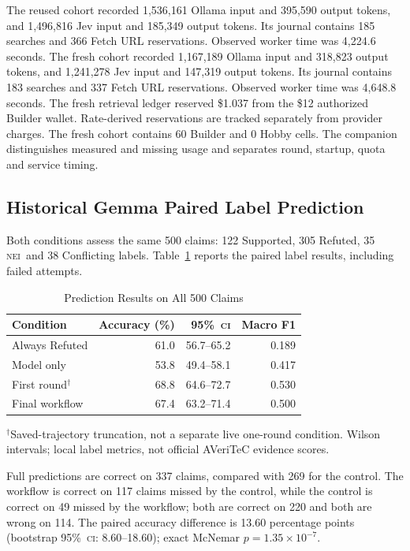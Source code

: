 \documentclass[conference]{IEEEtran}
\newcommand{\NEI}{\textsc{nei}}
\newcommand{\CI}{\textsc{ci}}
\newcommand{\pct}{\%}
\begin{document}
The reused cohort recorded 1,536,161 Ollama input and 395,590 output tokens, and 1,496,816 Jev input and 185,349 output tokens. Its journal contains 185 searches and 366 Fetch URL reservations. Observed worker time was 4,224.6 seconds. The fresh cohort recorded 1,167,189 Ollama input and 318,823 output tokens, and 1,241,278 Jev input and 147,319 output tokens. Its journal contains 183 searches and 337 Fetch URL reservations. Observed worker time was 4,648.8 seconds. The fresh retrieval ledger reserved \$1.037 from the \$12 authorized Builder wallet. Rate-derived reservations are tracked separately from provider charges. The fresh cohort contains 60 Builder and 0 Hobby cells. The companion distinguishes measured and missing usage and separates round, startup, quota and service timing.

\subsection{Historical Gemma Paired Label Prediction}
Both conditions assess the same 500 claims: 122 Supported, 305 Refuted, 35 \NEI\ and 38 Conflicting labels. Table~\ref{tab:prediction} reports the paired label results, including failed attempts.

\begin{table}[t]
\caption{Prediction Results on All 500 Claims}
\label{tab:prediction}
\centering
\footnotesize
\begin{tabular}{@{}lrrr@{}}
\toprule
Condition & Accuracy (\pct) & 95\pct\ \CI & Macro F1\\
\midrule
Always Refuted & 61.0 & 56.7--65.2 & 0.189\\
Model only & 53.8 & 49.4--58.1 & 0.417\\
First round$^{\dagger}$ & 68.8 & 64.6--72.7 & 0.530\\
Final workflow & 67.4 & 63.2--71.4 & 0.500\\
\bottomrule
\end{tabular}
\par\smallskip
\parbox{\columnwidth}{\footnotesize $^{\dagger}$Saved-trajectory truncation, not a separate live one-round condition. Wilson intervals; local label metrics, not official AVeriTeC evidence scores.}
\end{table}

Full predictions are correct on 337 claims, compared with 269 for the control. The workflow is correct on 117 claims missed by the control, while the control is correct on 49 missed by the workflow; both are correct on 220 and both are wrong on 114. The paired accuracy difference is 13.60 percentage points (bootstrap 95\pct\ \CI: 8.60--18.60); exact McNemar \(p=1.35\times 10^{-7}\).
\end{document}
